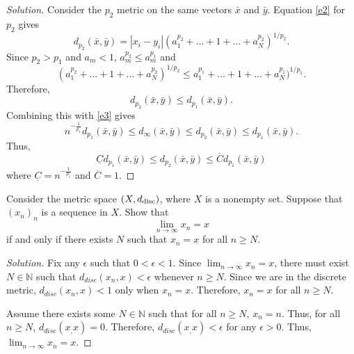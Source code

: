 \documentclass[11pt,letterpaper]{article}
\newcommand{\N}{\mathbb{N}}
\newenvironment{prob}[1]
  {\renewcommand\theinnerprob{#1}\innerprob}
  {\endinnerprob}
\newenvironment{solution}
  {\renewcommand\qedsymbol{}\begin{proof}[Solution]}
  {\end{proof}\bigskip}
\begin{document}
\begin{solution}
	Consider the $p_2$ metric on the same vectors $\bar x$ and $\bar y$. Equation \eqref{e2} for $p_2$ gives $$d_{p_2}(\bar x, \bar y) = |x_i-y_i| (a_1^{p_2} + \dotsc + 1 + \dotsc + a_N^{p_2})^{1/p_2}.$$ Since $p_2 > p_1$ and $a_m < 1$, $a_m^{p_2}\leq a_m^{p_1}$ and $$(a_1^{p_2} + \dotsc + 1 + \dotsc + a_N^{p_2})^{1/p_2} \leq a_1^{p_1} + \dotsc + 1 + \dotsc + a_N^{p_1})^{1/p_1}.$$ Therefore, $$d_{p_2}(\bar x, \bar y) \leq d_{p_1}(\bar x, \bar y).$$ Combining this with \eqref{e3} gives $$n^{-\frac{1}{p_1}}d_{p_1}(\bar x, \bar y) \leq d_\infty(\bar x, \bar y) \leq d_{p_2}(\bar x, \bar y) \leq d_{p_1}(\bar x, \bar y).$$ Thus, $$\underline C d_{p_1}(\bar x, \bar y) \leq d_{p_2}(\bar x, \bar y)
	\leq \overline C d_{p_1}(\bar x, \bar y)$$ where $\underline C = n^{-\frac{1}{p_1}}$ and $\overline C = 1$.
	
\end{solution}
\newpage






\begin{prob}{3}  %
Consider the metric space $(X, d_{\rm disc})$, where $X$ is a nonempty set.  Suppose that $(x_n)_n$ is a sequence in $X$.  Show that
\[
	\lim_{n\to\infty} x_n = x
\]
if and only if there exists $N$ such that $x_n = x$ for all $n \geq N$.
\end{prob}
\begin{solution}
	Fix any $\epsilon$ such that $0 < \epsilon < 1$. Since $\lim_{n\to\infty} x_n = x$, there must exist $N \in \N $ such that $d_{disc}(x_n,x)< \epsilon$ whenever $n\geq N$. Since we are in the discrete metric, $d_{disc}(x_n,x)< 1$ only when $x_n = x$. Therefore, $x_n = x$ for all $n\geq N$.
	
	Assume there exists some $N\in \N$ such that for all $n\geq N$, $x_n = n$. Thus, for all $n\geq N$, $d_{disc}(x_, x)  = 0$. Therefore, $d_{disc}(x_, x) < \epsilon$ for any $\epsilon > 0$. Thus, $\lim_{n\to\infty} x_n = x$.
\end{solution}
\newpage
\end{document}
